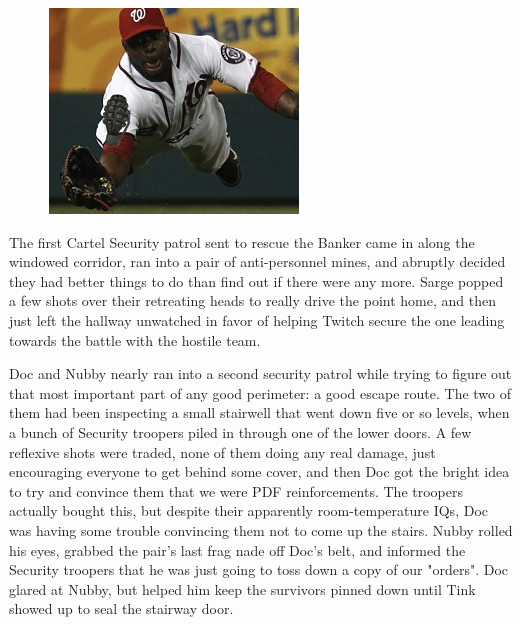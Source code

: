 \begin{figure}
	\begin{center}
		\includegraphics[width=\figwidth]{pics/18/30.png}
	\end{center}
\end{figure}
The first Cartel Security patrol sent to rescue the Banker came in along the windowed corridor, ran into a pair of anti-personnel mines, and abruptly decided they had better things to do than find out if there were any more. 
Sarge popped a few shots over their retreating heads to really drive the point home, and then just left the hallway unwatched in favor of helping Twitch secure the one leading towards the battle with the hostile team.

Doc and Nubby nearly ran into a second security patrol while trying to figure out that most important part of any good perimeter: 
a good escape route. 
The two of them had been inspecting a small stairwell that went down five or so levels, when a bunch of Security troopers piled in through one of the lower doors. 
A few reflexive shots were traded, none of them doing any real damage, just encouraging everyone to get behind some cover, and then Doc got the bright idea to try and convince them that we were PDF reinforcements. 
The troopers actually bought this, but despite their apparently room-temperature IQs, Doc was having some trouble convincing them not to come up the stairs. 
Nubby rolled his eyes, grabbed the pair's last frag nade off Doc's belt, and informed the Security troopers that he was just going to toss down a copy of our "orders". 
Doc glared at Nubby, but helped him keep the survivors pinned down until Tink showed up to seal the stairway door.

